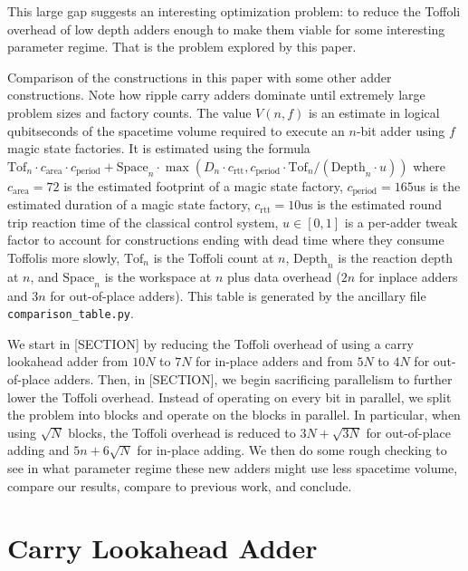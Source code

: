 \documentclass[onecolumn,unpublished]{quantumarticle}
\theoremstyle{definition}
\theoremstyle{definition}
\theoremstyle{definition}
\begin{document}
This large gap suggests an interesting optimization problem: to reduce the Toffoli overhead of low depth adders enough to make them viable for some interesting parameter regime.
That is the problem explored by this paper.

\begin{table}
\centering
\resizebox{\linewidth}{!}{

}
    \caption{Comparison of the constructions in this paper with some other adder constructions.
    Note how ripple carry adders dominate until extremely large problem sizes and factory counts.
    The value $V(n,f)$ is an estimate in logical qubitseconds of the spacetime volume required to execute an $n$-bit adder using $f$ magic state factories.
    It is estimated using the formula $\text{Tof}_n \cdot c_{\text{area}} \cdot c_{\text{period}} + \text{Space}_n \cdot \max(D_n \cdot c_{\text{rtt}}, c_{\text{period}} \cdot \text{Tof}_n / (\text{Depth}_n \cdot u))$ where $c_{\text{area}}=72$ is the estimated footprint of a magic state factory, $c_{\text{period}}=165$us is the estimated duration of a magic state factory, $c_{\text{rtt}}=10$us is the estimated round trip reaction time of the classical control system, $u \in [0, 1]$ is a per-adder tweak factor to account for constructions ending with dead time where they consume Toffolis more slowly, $\text{Tof}_n$ is the Toffoli count at $n$, $\text{Depth}_n$ is the reaction depth at $n$, and $\text{Space}_n$ is the workspace at $n$ plus data overhead ($2n$ for inplace adders and $3n$ for out-of-place adders). This table is generated by the ancillary file \texttt{comparison\_table.py}.
    }
    \label{tab:comparison}
\end{table}

We start in [SECTION] by reducing the Toffoli overhead of using a carry lookahead adder from $10N$ to $7N$ for in-place adders and from $5N$ to $4N$ for out-of-place adders.
Then, in [SECTION], we begin sacrificing parallelism to further lower the Toffoli overhead.
Instead of operating on every bit in parallel, we split the problem into blocks and operate on the blocks in parallel.
In particular, when using $\sqrt{N}$ blocks, the Toffoli overhead is reduced to $3N + \sqrt{3N}$ for out-of-place adding and $5n + 6\sqrt{N}$ for in-place adding.
We then do some rough checking to see in what parameter regime these new adders might use less spacetime volume, compare our results, compare to previous work, and conclude.

\section{Carry Lookahead Adder}
\end{document}
